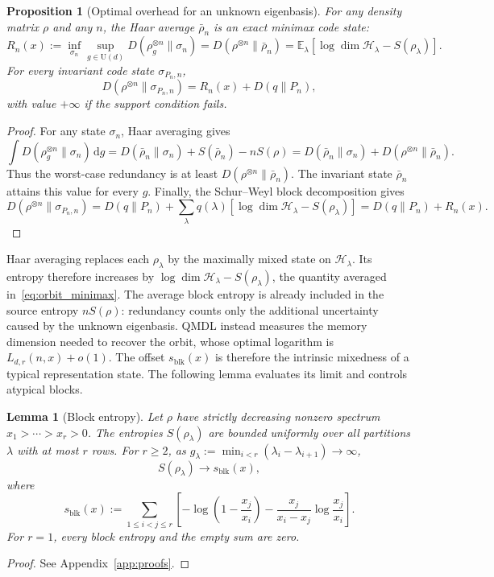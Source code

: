 \documentclass[a4paper,onecolumn,11pt]{quantumarticle}
\newtheorem{lem}{Lemma}
\newtheorem{prop}{Proposition}
\newcommand{\dd}{\mathrm{d}}
\def\h{\mathcal{H}}
\begin{document}
\begin{prop}[Optimal overhead for an unknown eigenbasis]\label{prop:orbit_redundancy}
For any density matrix $\rho$ and any $n$, the Haar average
$\bar\rho_n$ is an exact minimax code state:
\begin{equation}\label{eq:orbit_minimax}
R_n(x):=\inf_{\sigma_n}\sup_{g\in\mathrm U(d)}
D(\rho_g^{\otimes n}\|\sigma_n)
=D(\rho^{\otimes n}\|\bar\rho_n)
=\mathbb E_\lambda[\log\dim\h_\lambda-S(\rho_\lambda)].
\end{equation}
For every invariant code state $\sigma_{P_n,n}$,
\begin{equation}\label{eq:invariant_split}
D(\rho^{\otimes n}\|\sigma_{P_n,n})
=R_n(x)+D(q\|P_n),
\end{equation}
with value $+\infty$ if the support condition fails.
\end{prop}
\begin{proof}
For any state $\sigma_n$, Haar averaging gives
\[
\int D(\rho_g^{\otimes n}\|\sigma_n)\,\dd g
=D(\bar\rho_n\|\sigma_n)+S(\bar\rho_n)-nS(\rho)
=D(\bar\rho_n\|\sigma_n)
+D(\rho^{\otimes n}\|\bar\rho_n).
\]
Thus the worst-case redundancy is at least
$D(\rho^{\otimes n}\|\bar\rho_n)$. The invariant state $\bar\rho_n$
attains this value for every $g$. Finally, the Schur--Weyl block
decomposition gives
\[
D(\rho^{\otimes n}\|\sigma_{P_n,n})
=D(q\|P_n)+\sum_\lambda q(\lambda)
[\log\dim\h_\lambda-S(\rho_\lambda)]=D(q\|P_n)+R_n(x) .
\]
\end{proof}

Haar averaging replaces each $\rho_\lambda$ by the maximally mixed
state on $\h_\lambda$. Its entropy therefore increases by
$\log\dim\h_\lambda-S(\rho_\lambda)$, the quantity averaged
in~\eqref{eq:orbit_minimax}. The average block entropy is already
included in the source entropy $nS(\rho)$: redundancy counts only
the additional uncertainty caused by the unknown eigenbasis.
QMDL instead measures the memory dimension needed to recover the
orbit, whose optimal logarithm is $L_{d,r}(n,x)+o(1)$.
The offset $s_{\mathrm{blk}}(x)$ is therefore the intrinsic mixedness
of a typical representation state. The following lemma evaluates
its limit and controls atypical blocks.

\begin{lem}[Block entropy]\label{lem:block_entropy}
Let $\rho$ have strictly decreasing nonzero spectrum
$x_1>\cdots>x_r>0$. The entropies $S(\rho_\lambda)$ are bounded
uniformly over all partitions $\lambda$ with at most $r$ rows.
For $r\ge2$, as
$g_\lambda:=\min_{i<r}(\lambda_i-\lambda_{i+1})\to\infty$,
\[
S(\rho_\lambda)\longrightarrow s_{\mathrm{blk}}(x),
\]
where
\begin{equation}\label{eq:block_entropy_limit}
s_{\mathrm{blk}}(x):=\sum_{1\le i<j\le r}
\left[-\log\left(1-\frac{x_j}{x_i}\right)
-\frac{x_j}{x_i-x_j}\log\frac{x_j}{x_i}\right].
\end{equation}
For $r=1$, every block entropy and the empty sum are zero.
\end{lem}
\begin{proof}
See Appendix~\ref{app:proofs}.
\end{proof}
\end{document}
